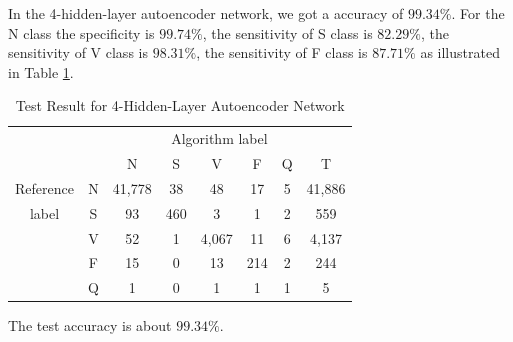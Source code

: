 \documentclass[journal]{IEEEtran}
\begin{document}
In the 4-hidden-layer autoencoder network, we got a accuracy of $99.34\%$. For the N class the specificity is $99.74\%$, the sensitivity of S class is $82.29\%$, the sensitivity of V class is $98.31\%$, the sensitivity of F class is $87.71\%$ as illustrated in Table \ref{table7}. 


\begin{table}[!htbp]
\begin{center}
\begin{threeparttable}
\caption{Test Result for 4-Hidden-Layer Autoencoder Network}
\label{table7}
\begin{tabular}{cccccccc}
\hline
\multicolumn{6}{r}{Algorithm label} \\
\cline{3-7}
&  & N & S & V & F & Q & T\\
\hline
 Reference & N & 41,778 &  38  &  48  & 17  & 5  &  41,886 \\
	label & S &  93   & 460  &   3  & 1   & 2  &  559\\
			   & V &  52   & 1    & 4,067 & 11  & 6  &  4,137\\
			   & F &  15   & 0    & 13   & 214 & 2  &  244\\
			  & Q &  1    & 0    & 1    & 1   & 1  &  5\\
\hline
\end{tabular}
\begin{tablenotes}
\item The test accuracy is about $99.34\%$.
\end{tablenotes}
\end{threeparttable}
\end{center}
\end{table}






\subsection{}
\subsection{}

\subsection{}
\subsection{}
\subsection{}
\end{document}
